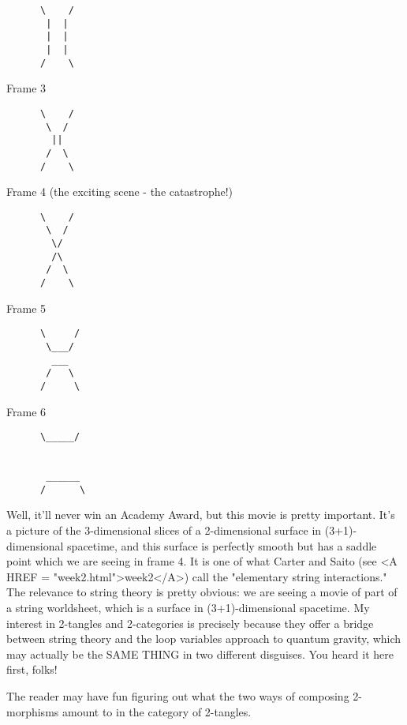 \begin{verbatim}
      \    /
       |  |
       |  |
       |  |
      /    \
\end{verbatim}
    

Frame 3

\begin{verbatim}
      \    /
       \  /
        ||
       /  \
      /    \
\end{verbatim}
    

Frame 4 (the exciting scene - the catastrophe!)

\begin{verbatim}
      \    /
       \  /
        \/
        /\
       /  \
      /    \
\end{verbatim}
    

Frame 5

\begin{verbatim}
      \     /
       \___/
        ___
       /   \
      /     \
\end{verbatim}
    

Frame 6

\begin{verbatim}
      \_____/
      
      
       ______     
      /      \

\end{verbatim}
    

Well, it'll never win an Academy Award, but this movie is pretty
important.  It's a picture of the 3-dimensional slices of
a 2-dimensional surface in (3+1)-dimensional spacetime, and this
surface is perfectly smooth but has a saddle point which we are seeing
in frame 4.  It is one of what Carter and Saito (see <A HREF = "week2.html">week2</A>)
call the "elementary string interactions."  The relevance to string
theory is pretty obvious: we are seeing a movie of part of a string
worldsheet, which is a surface in (3+1)-dimensional spacetime.  My
interest in 2-tangles and 2-categories is precisely because they offer a
bridge between string theory and the loop variables approach to quantum
gravity, which may actually be the SAME THING in two different
disguises.  You heard it here first, folks!

The reader may have fun figuring out what the two ways of composing
2-morphisms amount to in the category of 2-tangles.  

